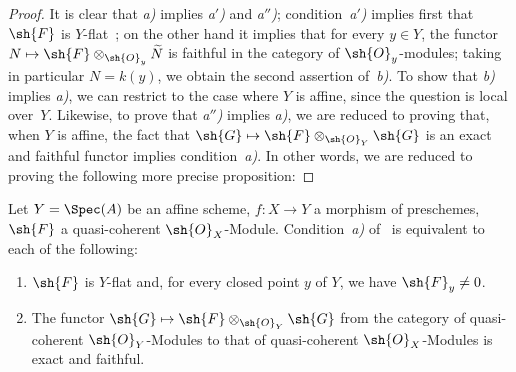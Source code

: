 \begin{proof}
It is clear that \emph{a)} implies \emph{a$'$)} and \emph{a$''$)}; condition~\emph{a$'$)} implies first that $\sh{F}$ is $Y$-flat~; on the other hand it implies that for every $y\in Y$, the functor $N\mapsto\sh{F}\otimes_{\sh{O}_y}\widetilde{N}$ is faithful in the category of $\sh{O}_y$-modules; taking in particular $N=k(y)$, we obtain the second assertion of~\emph{b)}.
To show that \emph{b)} implies \emph{a)}, we can restrict to the case where $Y$ is affine, since the question is local over~$Y$.
Likewise, to prove that \emph{a$''$)} implies \emph{a)}, we are reduced to proving that, when $Y$ is affine, the fact that $\sh{G}\mapsto\sh{F}\otimes_{\sh{O}_Y}\sh{G}$ is an exact and faithful functor implies condition~\emph{a)}.
In other words, we are reduced to proving the following more precise proposition:
\end{proof}

\begin{proposition}[2.2.2]
\label{IV.2.2.2}
Let $Y=\Spec(A)$ be an affine scheme, $f:X\to Y$ a morphism of preschemes, $\sh{F}$ a quasi-coherent $\sh{O}_X$-Module.
Condition~\emph{a)} of~ is equivalent to each of the following:
\begin{enumerate}
  \item[\emph{b$'$)}] $\sh{F}$ is $Y$-flat and, for every closed point $y$ of $Y$, we have $\sh{F}_y\neq 0$.
  \item[\emph{c)}] The functor $\sh{G}\mapsto\sh{F}\otimes_{\sh{O}_Y}\sh{G}$ from the category of quasi-coherent $\sh{O}_Y$-Modules to that of quasi-coherent $\sh{O}_X$-Modules is exact and faithful.
\end{enumerate}
\end{proposition}

